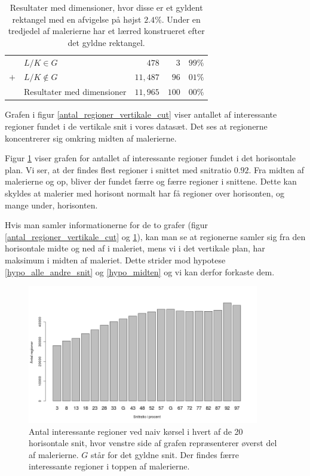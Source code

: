 {\begin{table}[H]
    \centering
    \begin{tabular}{r@{\ \ }p{14em}r|r@{.}l}
            & $L/K \in G$                  &    $478$ &   $3$ & $99\%$ \\
        $+$ & $L/K \notin G$               & $11,487$ &  $96$ & $01\%$ \\\hline
            & Resultater med dimensioner   & $11,965$ & $100$ & $00\%$
    \end{tabular}
    \caption[]{Resultater med dimensioner, hvor disse er et gyldent
    rektangel med en afvigelse på højst $2.4\%$. Under en tredjedel af
    malerierne har et lærred konstrueret efter det gyldne rektangel.}
    \label{tabel_real_dimensions}
\end{table}

Grafen i figur \ref{antal_regioner_vertikale_cut} viser antallet af
interessante regioner fundet i de vertikale snit i vores datasæt. Det
ses at regionerne koncentrerer sig omkring midten af malerierne.

Figur \ref{antal_regioner_horisontale_cut} viser grafen for antallet af
interessante regioner fundet i det horisontale plan. Vi ser, at der
findes flest regioner i snittet med snitratio $0.92$. Fra midten af
malerierne og op, bliver der fundet færre og færre regioner i snittene.
Dette kan skyldes at malerier med horisont normalt har få regioner over
horisonten, og mange under, horisonten.

Hvis man samler informationerne for de to grafer (figur
\ref{antal_regioner_vertikale_cut} og
\ref{antal_regioner_horisontale_cut}), kan man se at regionerne samler
sig fra den horisontale midte og ned af i maleriet, mens vi i det
vertikale plan, har maksimum i midten af maleriet. Dette strider mod
hypotese \ref{hypo_alle_andre_snit} og \ref{hypo_midten} og vi kan
derfor forkaste dem.

\begin{figure}[h!]
	\centering
	\includegraphics[width=0.9\textwidth]{afsnit/resultater/billeder/cut2cut3eatsperratio.png}
    \caption{Antal interessante regioner ved naiv kørsel i hvert af de
    20 horisontale snit, hvor venstre side af grafen repræsenterer
    øverst del af malerierne. $G$ står for det gyldne snit. Der findes
    færre interessante regioner i toppen af malerierne.}
	\label{antal_regioner_horisontale_cut}
\end{figure}

}
